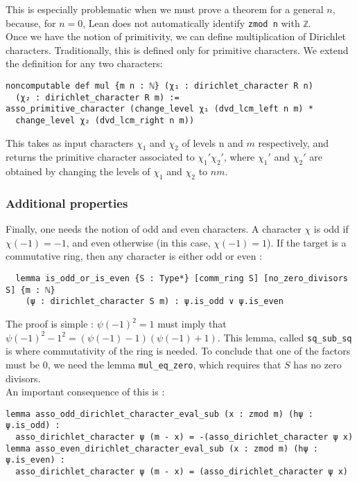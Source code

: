\documentclass[a4paper,UKenglish,cleveref, autoref, thm-restate]{lipics-v2021}
\newcommand{\lean}[1]{\texttt{#1}\xspace} %
\begin{document}
This is especially problematic when we must prove a theorem for a general $n$, because, for $n = 0$, Lean does 
not automatically identify \lean{zmod n} with \lean{ℤ}. \\
Once we have the notion of primitivity, we can define multiplication of Dirichlet characters. Traditionally, this is 
defined only for primitive characters. We extend the definition for any two characters: 
\begin{lstlisting}
noncomputable def mul {m n : ℕ} (χ₁ : dirichlet_character R n) 
  (χ₂ : dirichlet_character R m) :=
asso_primitive_character (change_level χ₁ (dvd_lcm_left n m) * 
  change_level χ₂ (dvd_lcm_right n m))
\end{lstlisting}
This takes as input characters $\chi_1$ and $\chi_2$ of levels n and $m$ respectively, and returns the primitive 
character associated to $\chi_1' \chi_2'$, where $\chi_1'$ and $\chi_2'$ are obtained by changing the levels 
of $\chi_1$ and $\chi_2$ to $n m$. 

\subsubsection{Additional properties}
Finally, one needs the notion of odd and even characters. A character $\chi$ is odd if $\chi (-1) = -1$, and 
even otherwise (in this case, $\chi (-1) = 1$). If the target is a commutative ring, then any character is 
either odd or even : 
\begin{lstlisting}
  lemma is_odd_or_is_even {S : Type*} [comm_ring S] [no_zero_divisors S] {m : ℕ} 
    (ψ : dirichlet_character S m) : ψ.is_odd ∨ ψ.is_even
\end{lstlisting}
The proof is simple : $\psi (-1)^2 = 1$ must imply that $\psi(-1)^2 - 1^2 = (\psi(-1) - 1)(\psi(-1) + 1)$. 
This lemma, called \lean{sq\_sub\_sq} is where commutativity of the ring is needed. To conclude that one 
of the factors must be 0, we need the lemma \lean{mul\_eq\_zero}, which requires that $S$ has no zero divisors. \\
An important consequence of this is : 
\begin{lstlisting}
lemma asso_odd_dirichlet_character_eval_sub (x : zmod m) (hψ : ψ.is_odd) :
  asso_dirichlet_character ψ (m - x) = -(asso_dirichlet_character ψ x)
lemma asso_even_dirichlet_character_eval_sub (x : zmod m) (hψ : ψ.is_even) :
  asso_dirichlet_character ψ (m - x) = (asso_dirichlet_character ψ x)
\end{lstlisting}
\end{document}
